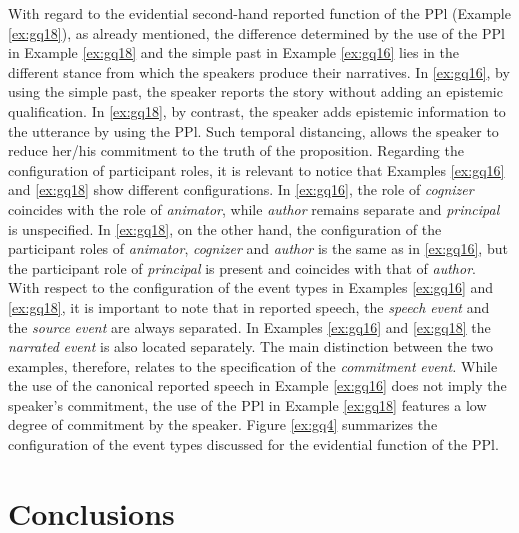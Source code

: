 \documentclass[output=paper]{langsci/langscibook}
\begin{document}
With regard to the evidential second-hand reported function of the PPl (Example \ref{ex:gq18}), as already mentioned, the difference determined by the use of the PPl in Example \ref{ex:gq18} and the simple past in Example \ref{ex:gq16} lies in the different stance from which the speakers produce their narratives. In \ref{ex:gq16}, by using the simple past, the speaker reports the story without adding an epistemic qualification. In \ref{ex:gq18}, by contrast, the speaker adds epistemic information to the utterance by using the PPl. Such temporal distancing, allows the speaker to reduce her/his commitment to the truth of the proposition. Regarding the configuration of participant roles, it is relevant to notice that Examples \ref{ex:gq16} and \ref{ex:gq18} show different configurations. In \ref{ex:gq16}, the role of \textit{cognizer} coincides with the role of \textit{animator}, while \textit{author} remains separate and \textit{principal} is unspecified. In \ref{ex:gq18}, on the other hand, the configuration of the participant roles of \textit{animator}, \textit{cognizer} and \textit{author} is the same as in \ref{ex:gq16}, but the participant role of \textit{principal} is present and coincides with that of \textit{author}. With respect to the configuration of the event types in Examples \ref{ex:gq16} and \ref{ex:gq18}, it is important to note that in reported speech, the \textit{speech} \textit{event} and the \textit{source} \textit{event} are always separated. In Examples \ref{ex:gq16} and \ref{ex:gq18} the \textit{narrated} \textit{event} is also located separately. The main distinction between the two examples, therefore, relates to the specification of the \textit{commitment} \textit{event.} While the use of the canonical reported speech in Example \ref{ex:gq16} does not imply the speaker’s commitment, the use of the PPl in Example \ref{ex:gq18} features a low degree of commitment by the speaker. Figure \ref{ex:gq4} summarizes the configuration of the event types discussed for the evidential function of the PPl. 


\section{Conclusions}\label{s:gq5}
\end{document}
